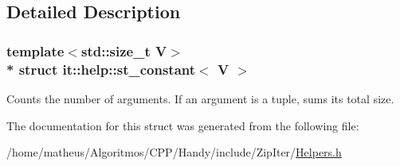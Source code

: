 \subsection{Detailed Description}
\subsubsection*{template$<$std\+::size\+\_\+t V$>$\\*
struct it\+::help\+::st\+\_\+constant$<$ V $>$}

Counts the number of arguments. If an argument is a tuple, sums its total size. 

The documentation for this struct was generated from the following file\+:\begin{DoxyCompactItemize}
\item 
/home/matheus/\+Algoritmos/\+C\+P\+P/\+Handy/include/\+Zip\+Iter/\hyperlink{ZipIter_2Helpers_8h}{Helpers.\+h}\end{DoxyCompactItemize}
